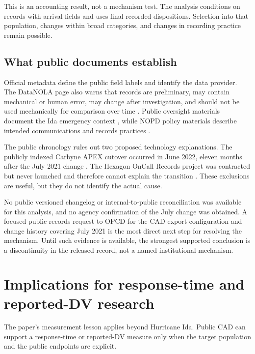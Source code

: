 \documentclass[11pt]{article}
\begin{document}
This is an accounting result, not a mechanism test. The analysis conditions on records with arrival fields and uses final recorded dispositions. Selection into that population, changes within broad categories, and changes in recording practice remain possible.

\subsection{What public documents establish}

Official metadata define the public field labels and identify the data provider. The DataNOLA page also warns that records are preliminary, may contain mechanical or human error, may change after investigation, and should not be used mechanically for comparison over time \citep{DataNOLA2021}. Public oversight materials document the Ida emergency context \citep{OIPM2021}, while NOPD policy materials describe intended communications and records practices \citep{NOPDPolicies2023}.

The public chronology rules out two proposed technology explanations. The publicly indexed Carbyne APEX cutover occurred in June 2022, eleven months after the July 2021 change \citep{OPCDCarbyne2022}. The Hexagon OnCall Records project was contracted but never launched and therefore cannot explain the transition \citep{NOLAOIGHexagon2024}. These exclusions are useful, but they do not identify the actual cause.

No public versioned changelog or internal-to-public reconciliation was available for this analysis, and no agency confirmation of the July change was obtained. A focused public-records request to OPCD for the CAD export configuration and change history covering July 2021 is the most direct next step for resolving the mechanism. Until such evidence is available, the strongest supported conclusion is a discontinuity in the released record, not a named institutional mechanism.

\section{Implications for response-time and reported-DV research}

The paper's measurement lesson applies beyond Hurricane Ida. Public CAD can support a response-time or reported-DV measure only when the target population and the public endpoints are explicit.
\end{document}
